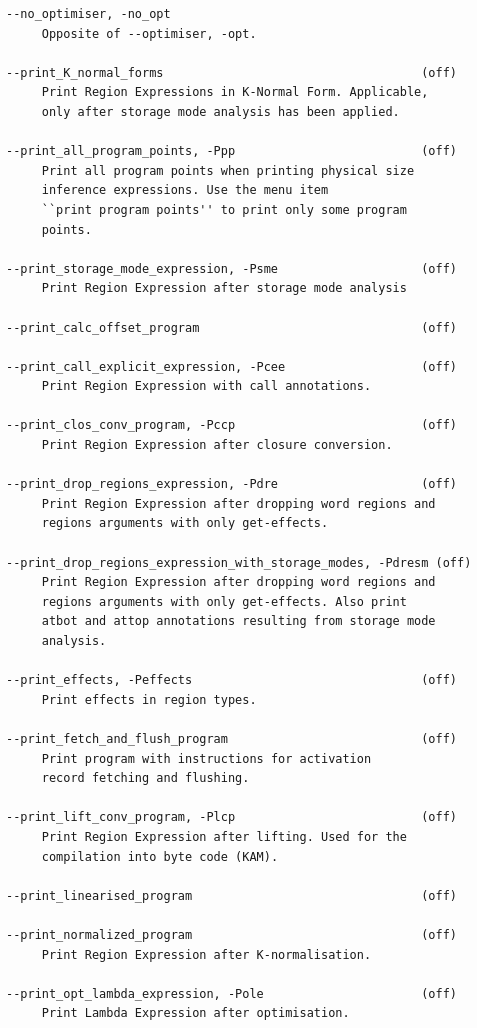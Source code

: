 \documentclass[12pt]{book}
\begin{document}
\begin{verbatim}
--no_optimiser, -no_opt
     Opposite of --optimiser, -opt.

--print_K_normal_forms                                    (off)
     Print Region Expressions in K-Normal Form. Applicable,
     only after storage mode analysis has been applied.

--print_all_program_points, -Ppp                          (off)
     Print all program points when printing physical size
     inference expressions. Use the menu item
     ``print program points'' to print only some program
     points.

--print_storage_mode_expression, -Psme                    (off)
     Print Region Expression after storage mode analysis

--print_calc_offset_program                               (off)

--print_call_explicit_expression, -Pcee                   (off)
     Print Region Expression with call annotations.

--print_clos_conv_program, -Pccp                          (off)
     Print Region Expression after closure conversion.

--print_drop_regions_expression, -Pdre                    (off)
     Print Region Expression after dropping word regions and
     regions arguments with only get-effects.

--print_drop_regions_expression_with_storage_modes, -Pdresm (off)
     Print Region Expression after dropping word regions and
     regions arguments with only get-effects. Also print
     atbot and attop annotations resulting from storage mode
     analysis.

--print_effects, -Peffects                                (off)
     Print effects in region types.

--print_fetch_and_flush_program                           (off)
     Print program with instructions for activation
     record fetching and flushing.

--print_lift_conv_program, -Plcp                          (off)
     Print Region Expression after lifting. Used for the
     compilation into byte code (KAM).

--print_linearised_program                                (off)

--print_normalized_program                                (off)
     Print Region Expression after K-normalisation.

--print_opt_lambda_expression, -Pole                      (off)
     Print Lambda Expression after optimisation.


\end{verbatim}
\end{document}
